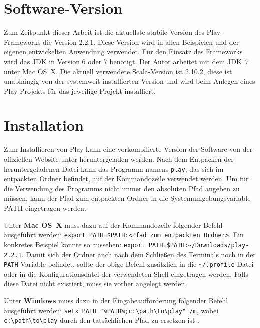 

\section{Software-Version} %
\label{sec:software_version}

Zum Zeitpunkt dieser Arbeit ist die aktuellste stabile Version des Play-Frameworks die Version 2.2.1.
Diese Version wird in allen Beispielen und der eigenen entwickelten Anwendung verwendet.
Für den Einsatz des Frameworks wird das JDK in Version 6 oder 7 benötigt.
Der Autor arbeitet mit dem JDK~7 unter Mac OS~X.
Die aktuell verwendete Scala-Version ist 2.10.2, diese ist unabhängig von der systemweit installierten Version und wird beim Anlegen eines Play-Projekts für das jeweilige Projekt installiert.



\section{Installation} %
\label{sec:installation}

Zum Installieren von Play kann eine vorkompilierte Version der Software von der offiziellen Website unter \cite{play_download} heruntergeladen werden.
Nach dem Entpacken der heruntergeladenen Datei kann das Programm namens \lstinline|play|, das sich im entpackten Ordner befindet, auf der Kommandozeile verwendet werden.
Um für die Verwendung des Programms nicht immer den absoluten Pfad angeben zu müssen, kann der Pfad zum entpackten Ordner in die Systemumgebungsvariable PATH eingetragen werden.

Unter \textbf{Mac OS~X} muss dazu auf der Kommandozeile folgender Befehl ausgeführt werden: \lstinline|export PATH=$PATH:<Pfad zum entpackten Ordner>|.
Ein konkretes Beispiel könnte so aussehen: \lstinline|export PATH=$PATH:~/Downloads/play-2.2.1|.
Damit sich der Ordner auch nach dem Schließen des Terminals noch in der \lstinline|PATH|-Variable befindet, sollte der obige Befehl zusätzlich in die \lstinline|~/.profile|-Datei oder in die Konfigurationsdatei der verwendeten Shell eingetragen werden.
Falls diese Datei nicht existiert, muss sie vorher angelegt werden.

Unter \textbf{Windows} muss dazu in der Eingabeaufforderung folgender Befehl ausgeführt werden: \lstinline|setx PATH "%PATH%;c:\path\to\play" /m|, wobei \lstinline|c:\path\to\play| durch den tatsächlichen Pfad zu ersetzen ist \cite[vgl.][S.~9]{play_for_scala}.

